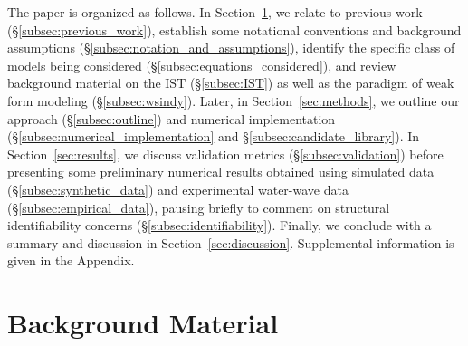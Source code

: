 \documentclass[journal=gmj]{CUP-JNL-DTM}%
\theoremstyle{definition}
\numberwithin{equation}{section}
\begin{document}
\smallskip

The paper is organized as follows. In Section~\ref{sec:preliminaries}, we relate to previous work (\S\ref{subsec:previous_work}), establish some notational conventions and background assumptions (\S\ref{subsec:notation_and_assumptions}), identify the specific class of models being considered (\S\ref{subsec:equations_considered}), and review background material on the IST (\S\ref{subsec:IST}) as well as the paradigm of weak form modeling (\S\ref{subsec:wsindy}). Later, in Section~\ref{sec:methods}, we outline our approach (\S\ref{subsec:outline}) and numerical implementation (\S\ref{subsec:numerical_implementation} and \S\ref{subsec:candidate_library}). In Section~\ref{sec:results}, we discuss validation metrics (\S\ref{subsec:validation}) before presenting some preliminary numerical results obtained using simulated data (\S\ref{subsec:synthetic_data}) and experimental water-wave data (\S\ref{subsec:empirical_data}), pausing briefly to comment on structural identifiability concerns (\S\ref{subsec:identifiability}). Finally, we conclude with a summary and discussion in Section~\ref{sec:discussion}. Supplemental information is given in the Appendix.

\section{Background Material}\label{sec:preliminaries}
\end{document}
